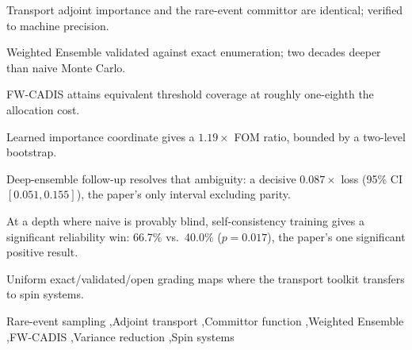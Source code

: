 \documentclass[a4paper,fleqn]{cas-sc}
\begin{document}
\begin{abstract}
Radiation transport's adjoint importance function and CADIS/weight window machinery mathematically identical to the rare-event committor are transferred to statistical mechanics and tested end-to-end on the 2D Ising ferromagnet and Edwards–Anderson spin glass. The adjoint committor identity is verified to machine precision, and Weighted Ensemble sampling (weight windows on spin configurations) reaches two decades deeper into the tail than naive Monte Carlo at matched cost. A self consistency training objective shaped directly on the harmonic committor condition finds rare events significantly more often than a hand-picked energy coordinate (66.7\% vs. 40.0\% hit rate, p = 0.017). A global variance reduction objective (FW-CADIS) achieves an eightfold cost reduction while matching uniform allocation's error profile. These results demonstrate the transport toolkit's effectiveness in the genuinely rare regime, and highlight the importance of a committor-shaped training objective rather than a convenient proxy.
\end{abstract}
\begin{highlights}
\item Transport adjoint importance and the rare-event committor are identical; verified to machine precision.
\item Weighted Ensemble validated against exact enumeration; two decades deeper than naive Monte Carlo.
\item FW-CADIS attains equivalent threshold coverage at roughly one-eighth the allocation cost.
\item Learned importance coordinate gives a $1.19\times$ FOM ratio, bounded by a two-level bootstrap.
\item Deep-ensemble follow-up resolves that ambiguity: a decisive $0.087\times$ loss (95\% CI $[0.051,0.155]$), the paper's only interval excluding parity.
\item At a depth where naive is provably blind, self-consistency training gives a significant reliability win: 66.7\% vs.\ 40.0\% ($p=0.017$), the paper's one significant positive result.
\item Uniform exact/validated/open grading maps where the transport toolkit transfers to spin systems.
\end{highlights}

\begin{keywords}
Rare-event sampling \sep Adjoint transport \sep Committor function \sep Weighted Ensemble \sep FW-CADIS \sep Variance reduction \sep Spin systems
\end{keywords}
\end{document}
